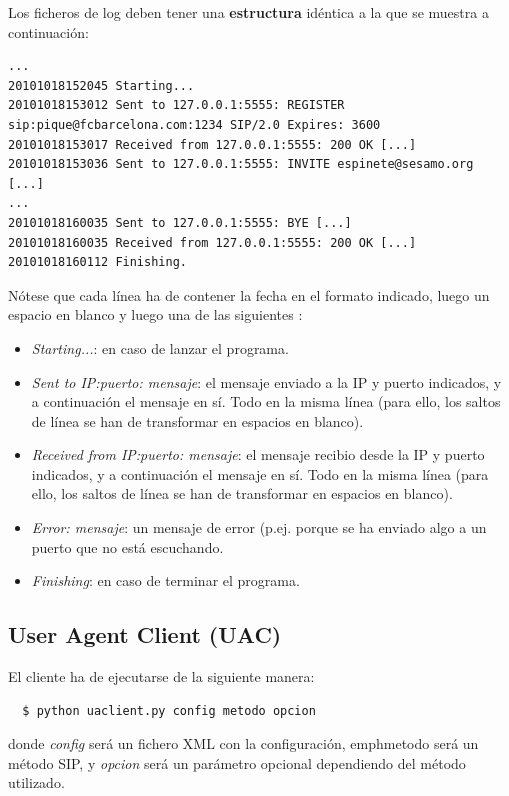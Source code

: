 \documentclass[a4paper,11pt]{article}
\begin{document}
Los ficheros de log deben tener una {\bf estructura} idéntica a la que se muestra a continuación:

\begin{footnotesize}
\begin{verbatim}
...
20101018152045 Starting...
20101018153012 Sent to 127.0.0.1:5555: REGISTER sip:pique@fcbarcelona.com:1234 SIP/2.0 Expires: 3600
20101018153017 Received from 127.0.0.1:5555: 200 OK [...]
20101018153036 Sent to 127.0.0.1:5555: INVITE espinete@sesamo.org [...]
...
20101018160035 Sent to 127.0.0.1:5555: BYE [...]
20101018160035 Received from 127.0.0.1:5555: 200 OK [...]
20101018160112 Finishing.
\end{verbatim}
\end{footnotesize}

Nótese que cada línea ha de contener la fecha en el formato indicado, luego
un espacio en blanco y luego una de las siguientes :

\begin{itemize}
  \item \emph{Starting...}: en caso de lanzar el programa.
  \item \emph{Sent to IP:puerto: mensaje}: el mensaje enviado a la IP y puerto indicados, y a continuación el mensaje en sí. Todo en la misma línea (para ello, los saltos de línea se han de transformar en espacios en blanco).
  \item \emph{Received from IP:puerto: mensaje}: el mensaje recibio desde la IP y puerto indicados, y a continuación el mensaje en sí. Todo en la misma línea (para ello, los saltos de línea se han de transformar en espacios en blanco).
  \item \emph{Error: mensaje}: un mensaje de error (p.ej. porque se ha enviado algo a un puerto que no está escuchando.
  \item \emph{Finishing}: en caso de terminar el programa.
\end{itemize}

\subsection{User Agent Client (UAC)}

El cliente ha de ejecutarse de la siguiente manera:
\begin{verbatim}
  $ python uaclient.py config metodo opcion
\end{verbatim}

donde \emph{config} será un fichero XML con la configuración,
emph{metodo} será un método SIP, y \emph{opcion} será un parámetro
opcional dependiendo del método utilizado.
\end{document}
